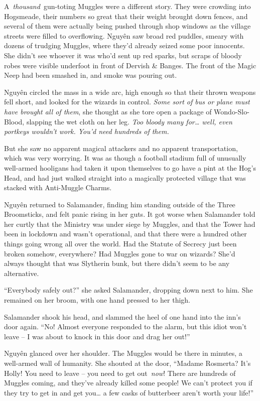 A~\emph{thousand}~gun-toting Muggles were a different story. They were
crowding into Hogsmeade, their numbers so great that their weight
brought down fences, and several of them were actually being pushed
through shop windows as the village streets were filled to overflowing.
Nguy\makebox[0pt][l]{\raisebox{0.5ex}{˜}}ên saw broad red puddles,
smeary with dozens of trudging Muggles, where they'd already seized some
poor innocents. She didn't see whoever it was who'd sent up red sparks,
but scraps of bloody robes were visible underfoot in front of Dervish \&
Banges. The front of the Magic Neep had been smashed in, and smoke was
pouring out.

Nguy\makebox[0pt][l]{\raisebox{0.5ex}{˜}}ên circled the mass in a wide
arc, high enough so that their thrown weapons fell short, and looked for
the wizards in control. \emph{Some sort of bus or plane must have
brought all of them}, she thought as she tore open a package of
Wondo-Slo-Blood, slapping the wet cloth on her leg. \emph{Too bloody
many for\ldots{} well, even portkeys wouldn't work. You'd need hundreds
of them.}

But she saw no apparent magical attackers and no apparent
transportation, which was very worrying. It was as though a football
stadium full of unusually well-armed hooligans had taken it upon
themselves to go have a pint at the Hog's Head, and had just walked
straight into a magically protected village that was stacked with
Anti-Muggle Charms.

Nguy\makebox[0pt][l]{\raisebox{0.5ex}{˜}}ên returned to Salamander,
finding him standing outside of the Three Broomsticks, and felt panic
rising in her guts. It got worse when Salamander told her curtly that
the Ministry was under siege by Muggles, and that the Tower had been in
lockdown and wasn't operational, and that there were a hundred other
things going wrong all over the world. Had the Statute of Secrecy just
been broken somehow, everywhere? Had Muggles gone to war on wizards?
She'd always thought that was Slytherin bunk, but there didn't seem to
be any alternative.

``Everybody safely out?'' she asked Salamander, dropping down next to
him. She remained on her broom, with one hand pressed to her thigh.

Salamander shook his head, and slammed the heel of one hand into the
inn's door again. ``No! Almost everyone responded to the alarm, but this
idiot won't leave -- I was about to knock in this door and drag her
out!''

Nguy\makebox[0pt][l]{\raisebox{0.5ex}{˜}}ên glanced over her shoulder.
The Muggles would be there in minutes, a well-armed wall of humanity.
She shouted at the door, ``Madame Rosmerta? It's Holly! You need to
leave -- you need to get out~\emph{now}! There are hundreds of Muggles
coming, and they've already killed some people! We can't protect you if
they try to get in and get you\ldots{} a few casks of butterbeer aren't
worth your life!''

